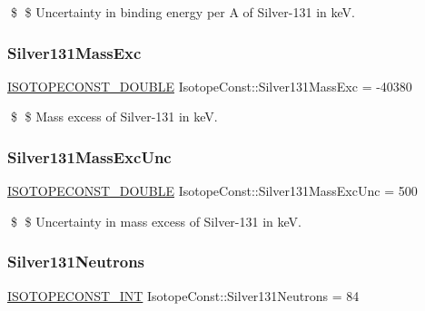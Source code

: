 \$ \$ Uncertainty in binding energy per A of Silver-\/131 in keV. \mbox{\label{group___isotope_const-_silver-_ag131_gada03d566677dd4624c33c71ba6aeba64}} 
\subsubsection{\texorpdfstring{Silver131\+Mass\+Exc}{Silver131MassExc}}
{\footnotesize\ttfamily \mbox{\hyperlink{group___isotope_const-_macros_ga8f45a7272ce02c0b4c65c44636ed719a}{I\+S\+O\+T\+O\+P\+E\+C\+O\+N\+S\+T\+\_\+\+D\+O\+U\+B\+LE}} Isotope\+Const\+::\+Silver131\+Mass\+Exc = -\/40380}

\$ \$ Mass excess of Silver-\/131 in keV. \mbox{\label{group___isotope_const-_silver-_ag131_ga306667ef9ba620428358a4886650437a}} 
\subsubsection{\texorpdfstring{Silver131\+Mass\+Exc\+Unc}{Silver131MassExcUnc}}
{\footnotesize\ttfamily \mbox{\hyperlink{group___isotope_const-_macros_ga8f45a7272ce02c0b4c65c44636ed719a}{I\+S\+O\+T\+O\+P\+E\+C\+O\+N\+S\+T\+\_\+\+D\+O\+U\+B\+LE}} Isotope\+Const\+::\+Silver131\+Mass\+Exc\+Unc = 500}

\$ \$ Uncertainty in mass excess of Silver-\/131 in keV. \mbox{\label{group___isotope_const-_silver-_ag131_ga4af4d88ea139b854034255ce9a64eeb3}} 
\subsubsection{\texorpdfstring{Silver131\+Neutrons}{Silver131Neutrons}}
{\footnotesize\ttfamily \mbox{\hyperlink{group___isotope_const-_macros_ga5f18360b3e99483a35c32d789e62621c}{I\+S\+O\+T\+O\+P\+E\+C\+O\+N\+S\+T\+\_\+\+I\+NT}} Isotope\+Const\+::\+Silver131\+Neutrons = 84}

